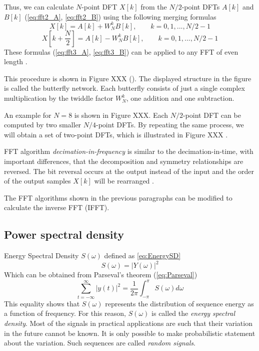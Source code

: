 \documentclass[twoside]{ctuthesis}
\theoremstyle{plain}
\theoremstyle{definition}
\theoremstyle{note}
\begin{document}
Thus, we can calculate $N$-point DFT $X[k]$ from the $N/2$-point DFTs $A[k]$ and $B[k]$ (\ref{eq:fft2_A}, \ref{eq:fft2_B}) using the following merging formulas
\begin{equation} \label{eq:fft3_A}
X[k]=A[k] + W^{k}_{N}B[k],\qquad k=0, 1, ..., N/2 -1
\end{equation}
\begin{equation} \label{eq:fft3_B}
X[k+\frac{N}{2}]=A[k] - W^{k}_{N}B[k],\qquad k=0, 1, ..., N/2 -1
\end{equation}
These formulas (\ref{eq:fft3_A}, \ref{eq:fft3_B}) can be applied to any FFT of even length \cite{cite:3}.

This procedure is shown in Figure XXX (\cite{cite:3}). The displayed structure in the figure is called the butterfly network. Each butterfly consists of just a single complex multiplication by the twiddle factor $W^{k}_{N}$, one addition and one subtraction. 

An example for $N=8$ is shown in Figure XXX. Each $N/2$-point DFT can be computed by two smaller $N/4$-point DFTs. By repeating the same process, we will obtain a set of two-point DFTs, which is illustrated in Figure XXX \cite{cite:RT_DSP}.

FFT algorithm \textit{decimation-in-frequency} is similar to the decimation-in-time, with important differences, that the decomposition and symmetry relationships are reversed. The bit reversal occurs at the output instead of the input and the order of the output samples $X[k]$ will be rearranged \cite{cite:RT_DSP}.

The FFT algorithms shown in the previous paragraphs can be modified to calculate the inverse FFT (IFFT).

\subsection{Power spectral density}
Energy Spectral Density $S(\omega)$ defined as \ref{eq:EnergySD}
\begin{equation} \label{eq:EnergySD}
S(\omega)=\left|Y(\omega)\right|^2
\end{equation}
Which can be obtained from Parseval's theorem (\ref{eq:Parseval})
\begin{equation} \label{eq:Parseval}
\sum_{t=-\infty}^{\infty}\left|y(t)\right|^2 = \frac{1}{2\pi}\int_{-\pi}^{\pi}S(\omega)d\omega
\end{equation}
This equality shows that $S(\omega)$ represents the distribution of sequence energy as a function of frequency. For this reason, $S(\omega)$ is called the \textit{energy spectral density}. 
Most of the signals in practical applications are such that their variation in the future cannot be known. It is only possible to make probabilistic statement about the variation. Such sequences are called \textit{random signals}. 
\end{document}
